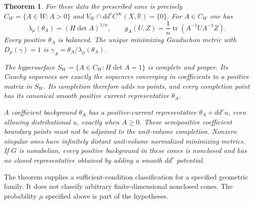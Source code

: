 \documentclass[11pt]{article}
\newtheorem{theorem}{Theorem}
\newcommand{\ddc}{dd^c}
\newcommand{\tr}{\operatorname{tr}}
\begin{document}
\begin{theorem}\label{thm:main}
For these data the prescribed cone is precisely
$C_W=\{A\in W:A>0\}$ and $V_W\cap\ddc C^\infty(X,\mathbb R)=\{0\}$.
For $A\in C_W$ one has
\begin{equation}\label{eq:volume}
 \lambda_\mu(\theta_A)=(H\det A)^{1/n},\qquad
 g_A(U,Z)=\frac1n\tr(A^{-1}UA^{-1}Z).
\end{equation}
Every positive $\theta_A$ is balanced. The unique minimizing Gauduchon
metric with $D_\mu(\gamma)=1$ is
$\gamma_A=\theta_A/\lambda_\mu(\theta_A)$.

The hypersurface $S_W=\{A\in C_W:H\det A=1\}$ is complete and proper.
Its Cauchy sequences are exactly the sequences converging in coefficients
to a positive matrix in $S_W$. Its completion therefore adds no points,
and every completion point has its canonical smooth positive current
representative $\theta_A$.

A coefficient background $\theta_A$ has a positive-current representative
$\theta_A+\ddc u$, even allowing distributional $u$, exactly when $A\geq0$.
These semipositive coefficient boundary points must not be adjoined to
the unit-volume completion. Nonzero singular ones have infinitely distant
unit-volume normalized minimizing metrics.
If $G$ is nonabelian, every positive background in these cones is nonclosed
and has no closed representative obtained by adding a smooth $\ddc$ potential.
\end{theorem}

The theorem supplies a sufficient-condition classification for a specified
geometric family. It does not classify arbitrary finite-dimensional
nonclosed cones. The probability $\mu$ specified above is part of the
hypotheses.
\end{document}
